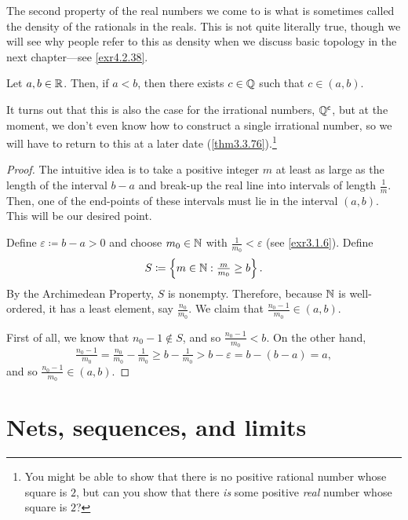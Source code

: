 \horizontalrule

The second property of the real numbers we come to is what is sometimes called the density of the rationals in the reals.  This is not quite literally true, though we will see why people refer to this as density when we discuss basic topology in the next chapter---see \cref{exr4.2.38}.
\begin{thm}[`Density' of $\Q$ in $\R$]\label{thm3.2.14}
Let $a,b\in \mathbb{R}$.  Then, if $a<b$, then there exists $c\in \mathbb{Q}$ such that $c\in (a,b)$.
\begin{rmk}
It turns out that this is also the case for the irrational numbers, $\mathbb{Q} ^{\mathsf{c}}$, but at the moment, we don't even know how to construct a single irrational number, so we will have to return to this at a later date (\cref{thm3.3.76}).\footnote{You might be able to show that there is no positive rational number whose square is $2$, but can you show that there \emph{is} some positive \emph{real} number whose square is $2$?}
\end{rmk}
\begin{proof}
The intuitive idea is to take a positive integer $m$ at least as large as the length of the interval $b-a$ and break-up the real line into intervals of length $\frac{1}{m}$.  Then, one of the end-points of these intervals must lie in the interval $(a,b)$.  This will be our desired point.

Define $\varepsilon \coloneqq b-a>0$ and choose $m_0\in \mathbb{N}$ with $\frac{1}{m_0}<\varepsilon$ (see \cref{exr3.1.6}).  Define
\begin{equation}
S\coloneqq \left\{ m\in \mathbb{N} :\tfrac{m}{m_0}\geq b\right\} .
\end{equation}
By the Archimedean Property, $S$ is nonempty.  Therefore, because $\mathbb{N}$ is well-ordered, it has a least element, say $\frac{n_0}{m_0}$.  We claim that $\frac{n_0-1}{m_0}\in (a,b)$.

First of all, we know that $n_0-1\notin S$, and so $\frac{n_0-1}{m_0}<b$.  On the other hand,
\begin{equation}
\tfrac{n_0-1}{m_0}=\tfrac{n_0}{m_0}-\tfrac{1}{m_0}\geq b-\tfrac{1}{m_0}>b-\varepsilon =b-(b-a)=a,
\end{equation}
and so $\frac{n_0-1}{m_0}\in (a,b)$.
\end{proof}
\end{thm}

\section{Nets, sequences, and limits}

